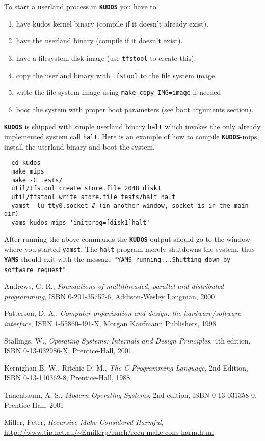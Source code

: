 \documentclass[twoside,a4paper]{report}
\newcommand{\kudos}{\texttt{\textbf{KUDOS}}}
\newcommand{\yams}{\texttt{\textbf{YAMS}}}
\begin{document}
To start a userland process in \kudos{} you have to
\begin{enumerate}
\item have kudos{} kernel binary (compile if it doesn't already
  exist).
\item have the userland binary (compile if it doesn't exist).
\item have a filesystem disk image (use \texttt{tfstool} to create
  this).
\item copy the userland binary with \texttt{tfstool} to the file
  system image.
\item write the file system image using \texttt{make copy IMG=image} if needed
\item boot the system with proper boot parameters (see boot arguments section).
\end{enumerate}

\kudos{} is shipped with simple userland binary \texttt{halt} which
invokes the only already implemented system call \texttt{halt}. Here
is an example of how to compile \kudos{}-mips, install the userland binary
and boot the system.

\begin{verbatim}
  cd kudos
  make mips
  make -C tests/
  util/tfstool create store.file 2048 disk1
  util/tfstool write store.file tests/halt halt
  yamst -lu tty0.socket # (in another window, socket is in the main dir)
  yams kudos-mips 'initprog=[disk1]halt'
\end{verbatim}

After running the above commands the \kudos{} output should go to the
window where you started \texttt{yamst}. The \texttt{halt} program
merely shutdowns the system, thus \yams{} should exit with the message
\texttt{"YAMS running...Shutting down by software request"}.

\clearpage
{}
{}
\begin{thebibliography}{Tanenbaum}

Andrews, G. R., \emph{Foundations of multithreaded, parallel and
distributed programming}, ISBN 0-201-35752-6, Addison-Wesley Longman,
2000

Patterson, D. A., \emph{Computer organization and design: the
hardware/software interface}, ISBN 1-55860-491-X, Morgan Kaufmann
Publishers, 1998

Stallings, W., \emph{Operating Systems: Internals and Design
Principles}, 4th edition, ISBN 0-13-032986-X, Prentice-Hall, 2001

Kernighan B. W., Ritchie D. M., \emph{The C Programming Language}, 2nd
Edition, ISBN \mbox{0-13-110362-8}, Prentice-Hall, 1988

Tanenbaum, A. S., \emph{Modern Operating Systems}, 2nd edition, ISBN
\mbox{0-13-031358-0}, Prentice-Hall, 2001

Miller, Peter, \emph{Recursive Make Considered Harmful},
\url{http://www.tip.net.au/~Emillerp/rmch/recu-make-cons-harm.html}


\end{thebibliography}

\printindex
\end{document}
